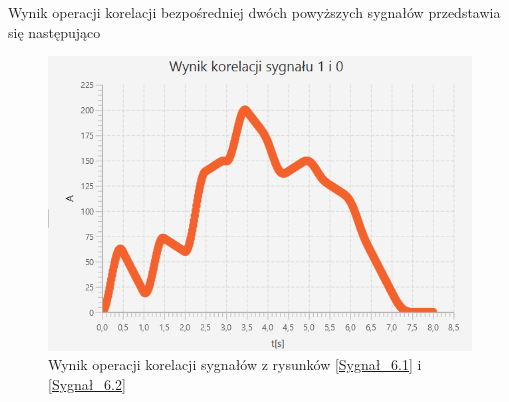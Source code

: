 \documentclass[12pt]{article}
\begin{document}
Wynik operacji korelacji bezpośredniej dwóch powyższych sygnałów przedstawia się następująco
\begin{figure}[H]
    \centering
	\includegraphics[width=\linewidth]{Korelacja_61.png}
    \caption{Wynik operacji korelacji sygnałów z rysunków \ref{Sygnał_6.1} i \ref{Sygnał_6.2}}
    \label{Wynik_6.1}
\end{figure}

\end{document}
